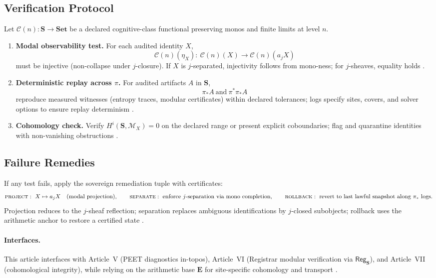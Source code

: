 \documentclass[12pt]{amsart}
\theoremstyle{plain}
\begin{document}
\subsection{Verification Protocol}
Let $\mathcal{C}(n):\mathbf{S}\to\mathbf{Set}$ be a declared cognitive-class functional preserving monos and finite limits at level $n$.
\begin{enumerate}
  \item \textbf{Modal observability test.} For each audited identity $X$,
  \[
  \mathcal{C}(n)(\eta_X):\ \mathcal{C}(n)(X)\to \mathcal{C}(n)(a_j X)
  \]
  must be injective (non-collapse under $j$-closure). If $X$ is $j$-separated, injectivity follows from mono-ness; for $j$-sheaves, equality holds \cite{maclane1992sheaves,johnstone2002elephant}.
  \item \textbf{Deterministic replay across $\pi$.} For audited artifacts $A$ in $\mathbf{S}$,
  \[
  \pi_{\ast}A\ \text{and}\ \pi^{\ast}\pi_{\ast}A
  \]
  reproduce measured witnesses (entropy traces, modular certificates) within declared tolerances; logs specify sites, covers, and solver options to ensure replay determinism \cite{maclane1992sheaves,johnstone2002elephant,milne1980etale}.
  \item \textbf{Cohomology check.} Verify $H^i(\mathbf{S},\mathscr{M}_X)=0$ on the declared range or present explicit coboundaries; flag and quarantine identities with non-vanishing obstructions \cite{milne1980etale,hartshorne1977algebraic}.
\end{enumerate}

\subsection{Failure Remedies}
If any test fails, apply the sovereign remediation tuple with certificates:
\[
\textsc{project}:\ X\mapsto a_j X\quad\text{(modal projection)},\qquad
\textsc{separate}:\ \text{enforce $j$-separation via mono completion},\qquad
\textsc{rollback}:\ \text{revert to last lawful snapshot along }\pi_{\ast}\text{ logs}.
\]
Projection reduces to the $j$-sheaf reflection; separation replaces ambiguous identifications by $j$-closed subobjects; rollback uses the arithmetic anchor to restore a certified state \cite{maclane1992sheaves,johnstone2002elephant}.

\paragraph{Interfaces.}
This article interfaces with Article~V (PEET diagnostics in-topos), Article~VI (Registrar modular verification via $\mathsf{Reg}_{\mathbf{S}}$), and Article~VII (cohomological integrity), while relying on the arithmetic base $\mathbf{E}$ for site-specific cohomology and transport \cite{milne1980etale,maclane1992sheaves,johnstone2002elephant}.
\end{document}
